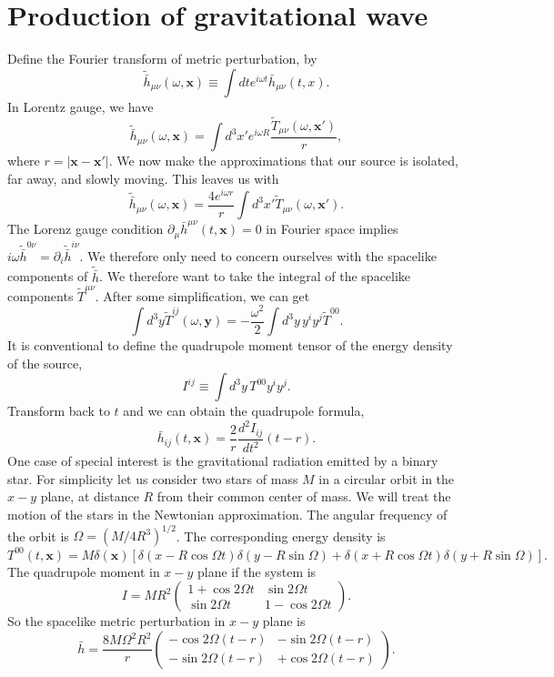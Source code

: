 \section{Production of gravitational wave}
Define the Fourier transform of metric perturbation, by
\[\widetilde{\bar{h}}_{\mu\nu}(\omega, \bm{x}) \equiv \int dt e^{i\omega t} \bar{h}_{\mu\nu}(t,x).\]
In Lorentz gauge, we have
\[\widetilde{\bar{h}}_{\mu\nu}(\omega, \bm{x}) = \int d^3x' e^{i\omega R} \frac{\widetilde{T}_{\mu\nu}(\omega,\bm{x}')}{r},\]
where $r = |\bm{x} - \bm{x}'|$.
We now make the approximations that our source is isolated, far away, and slowly moving. This leaves us with
\[\widetilde{\bar{h}}_{\mu\nu}(\omega, \bm{x}) = \frac{4e^{i\omega r}}{r} \int d^3x' \tilde{T}_{\mu\nu}(\omega, \bm{x}').\]
The Lorenz gauge condition $\partial_{\mu}\bar{h}^{\mu\nu}(t,\bm{x}) = 0$ in Fourier space implies $i\omega \widetilde{\bar{h}}^{0\nu} = \partial_{i} \widetilde{\bar{h}}^{i\nu}$. 
We therefore only need to concern ourselves with the spacelike components of $\widetilde{\bar{h}}$.
We therefore want to take the integral of the spacelike components $\widetilde{T}^{\mu\nu}$. After some simplification, we can get
\[\int d^3y \widetilde{T}^{ij}(\omega,\bm{y}) = - \frac{\omega^2}{2} \int  d^3y \, y^i y^j \widetilde{T}^{00}.\]
It is conventional to define the quadrupole moment tensor of the energy density of the source,
\[I^{ij} \equiv \int d^3y \, T^{00} y^i y^j.\]
Transform back to $t$ and we can obtain the quadrupole formula,
\[\bar{h}_{ij}(t,\bm{x}) = \frac{2}{r} \frac{d^2 I_{ij}}{dt^2}(t-r).\]
One case of special interest is the gravitational radiation emitted by a binary star. 
For simplicity let us consider two stars of mass $M$ in a circular orbit in the $x-y$ plane, at distance $R$ from their common center of mass. 
We will treat the motion of the stars in the Newtonian approximation. The angular frequency of the orbit is $\Omega = (M/4R^3)^{1/2}$. 
The corresponding energy density is
\[T^{00}(t,\bm{x}) = M\delta(\bm{x}) [\delta(x-R\cos\Omega t)\delta(y-R\sin\Omega) + \delta(x+R\cos\Omega t)\delta(y+R\sin\Omega)].\]
The quadrupole moment in $x-y$ plane if the system is
\[I = MR^2 \begin{pmatrix}
1 + \cos 2\Omega t & \sin 2\Omega t \\
\sin 2\Omega t & 1 - \cos 2\Omega t
\end{pmatrix}. \]
So the spacelike metric perturbation in $x-y$ plane is
\[\bar{h} = \frac{8M\Omega^2R^2}{r} \begin{pmatrix}
- \cos 2\Omega (t-r) & -\sin 2\Omega (t-r) \\
-\sin 2\Omega (t-r) & + \cos 2\Omega (t-r)
\end{pmatrix}. \]

